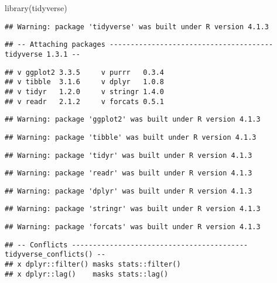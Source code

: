 \documentclass[
]{article}
\newenvironment{Shaded}{\begin{snugshade}}{\end{snugshade}}
\newcommand{\FunctionTok}[1]{\textcolor[rgb]{0.00,0.00,0.00}{#1}}
\newcommand{\NormalTok}[1]{#1}
\begin{document}
\begin{Shaded}
\begin{Highlighting}[]
\FunctionTok{library}\NormalTok{(tidyverse)}
\end{Highlighting}
\end{Shaded}

\begin{verbatim}
## Warning: package 'tidyverse' was built under R version 4.1.3
\end{verbatim}

\begin{verbatim}
## -- Attaching packages --------------------------------------- tidyverse 1.3.1 --
\end{verbatim}

\begin{verbatim}
## v ggplot2 3.3.5     v purrr   0.3.4
## v tibble  3.1.6     v dplyr   1.0.8
## v tidyr   1.2.0     v stringr 1.4.0
## v readr   2.1.2     v forcats 0.5.1
\end{verbatim}

\begin{verbatim}
## Warning: package 'ggplot2' was built under R version 4.1.3
\end{verbatim}

\begin{verbatim}
## Warning: package 'tibble' was built under R version 4.1.3
\end{verbatim}

\begin{verbatim}
## Warning: package 'tidyr' was built under R version 4.1.3
\end{verbatim}

\begin{verbatim}
## Warning: package 'readr' was built under R version 4.1.3
\end{verbatim}

\begin{verbatim}
## Warning: package 'dplyr' was built under R version 4.1.3
\end{verbatim}

\begin{verbatim}
## Warning: package 'stringr' was built under R version 4.1.3
\end{verbatim}

\begin{verbatim}
## Warning: package 'forcats' was built under R version 4.1.3
\end{verbatim}

\begin{verbatim}
## -- Conflicts ------------------------------------------ tidyverse_conflicts() --
## x dplyr::filter() masks stats::filter()
## x dplyr::lag()    masks stats::lag()
\end{verbatim}
\end{document}
